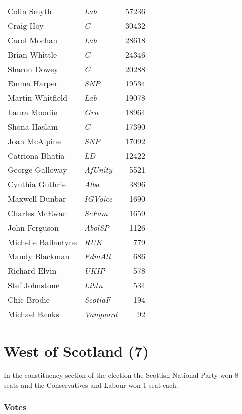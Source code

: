 {\footnotesize
\begin{tabular*}{\columnwidth}{@{\extracolsep{\fill}} p{} >{\itshape}l r @{\extracolsep{\fill}}}
	Colin Smyth & Lab & 57236\\%
	Craig Hoy & C & 30432\\%
	Carol Mochan & Lab & 28618\\%
	Brian Whittle & C & 24346\\%
	Sharon Dowey & C & 20288\\%
	Emma Harper & SNP & 19534\\%
	Martin Whitfield & Lab & 19078\\%
	\hline
	Laura Moodie & Grn & 18964\\
	Shona Haslam & C & 17390\\
	Joan McAlpine & SNP & 17092\\
	Catriona Bhatia & LD & 12422\\
	George Galloway & AfUnity & 5521\\
	Cynthia Guthrie & Alba & 3896\\
	Maxwell Dunbar & IGVoice & 1690\\
	Charles McEwan & ScFam & 1659\\
	John Ferguson & AbolSP & 1126\\
	Michelle Ballantyne & RUK & 779\\
	Mandy Blackman & FdmAll & 686\\
	Richard Elvin & UKIP & 578\\
	Stef Johnstone & Libtn & 534\\
	Chic Brodie & ScotiaF & 194\\
	Michael Banks & Vanguard & 92\\
\end{tabular*}

}

\vfill\eject

\section[West of Scotland]{West of Scotland (7)}

In the constituency section of the election the Scottish National Party won 8 seats and the Conservatives and Labour won 1 seat each.

\subsubsection*{Votes}

